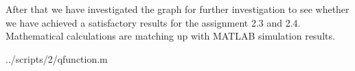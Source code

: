 After that we have investigated the graph for further investigation to see whether we have achieved a satisfactory results for the assignment 2.3 and 2.4. Mathematical calculations are matching up with MATLAB simulation results.

\begin{lstinputlisting}[language=Octave]{../scripts/2/qfunction.m}
\end{lstinputlisting}